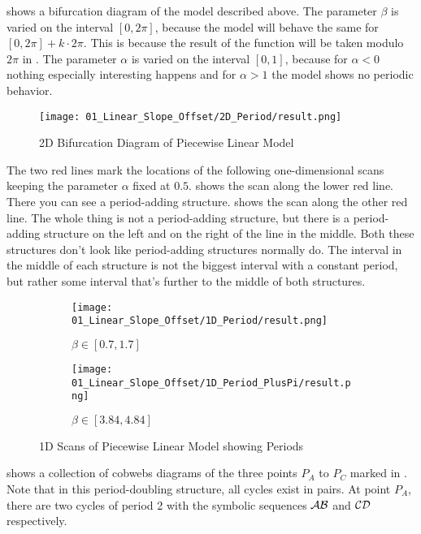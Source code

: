  shows a bifurcation diagram of the model described above.
The parameter $\beta$ is varied on the interval $[0, 2 \pi]$, because the model will behave the same for $[0, 2 \pi] + k \cdot 2 \pi$.
This is because the result of the function will be taken modulo $2 \pi$ in .
The parameter $\alpha$ is varied on the interval $[0, 1]$, because for $\alpha < 0$ nothing especially interesting happens and for $\alpha > 1$ the model shows no periodic behavior.

\begin{figure}
    \centering
    \texttt{[image: 01\_Linear\_Slope\_Offset/2D\_Period/result.png]}
    \caption{2D Bifurcation Diagram of Piecewise Linear Model}
    \label{fig:pcw.lin.2d}
\end{figure}

The two red lines mark the locations of the following one-dimensional scans keeping the parameter $\alpha$ fixed at $0.5$.
 shows the scan along the lower red line.
There you can see a period-adding structure.
 shows the scan along the other red line.
The whole thing is not a period-adding structure, but there is a period-adding structure on the left and on the right of the line in the middle.
Both these structures don't look like period-adding structures normally do.
The interval in the middle of each structure is not the biggest interval with a constant period, but rather some interval that's further to the middle of both structures.

\begin{figure}
    \centering
    \begin{subfigure}{0.4\textwidth}
        \centering
        \texttt{[image: 01\_Linear\_Slope\_Offset/1D\_Period/result.png]}
        \caption{$\beta \in [0.7, 1.7]$}
        \label{fig:pcw.lin.1D}
    \end{subfigure}
    \begin{subfigure}{0.4\textwidth}
        \centering
        \texttt{[image: 01\_Linear\_Slope\_Offset/1D\_Period\_PlusPi/result.png]}
        \caption{$\beta \in [3.84, 4.84]$}
        \label{fig:pcw.lin.1DPlusPi}
    \end{subfigure}
    \caption{1D Scans of Piecewise Linear Model showing Periods}
\end{figure}

 shows a collection of cobwebs diagrams of the three points $P_A$ to $P_C$ marked in .
Note that in this period-doubling structure, all cycles exist in pairs.
At point $P_A$, there are two cycles of period 2 with the symbolic sequences $\mathcal{A}\mathcal{B}$ and $\mathcal{C}\mathcal{D}$ respectively.

